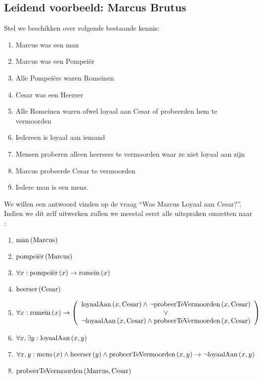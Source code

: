 \subsection{Leidend voorbeeld: Marcus Brutus}
\begin{leftbar}
Stel we beschikken over volgende bestaande kennis:
\begin{enumerate}
 \item Marcus was een man
 \item Marcus was een Pompeiër
 \item Alle Pompeiërs waren Romeinen
 \item Cesar was een Heerser
 \item Alle Romeinen waren ofwel loyaal aan Cesar of probeerden hem te vermoorden
 \item Iedereen is loyaal aan iemand
 \item Mensen proberen alleen heersers te vermoorden waar ze niet loyaal aan zijn
 \item Marcus probeerde Cesar te vermoorden
 \item Iedere man is een mens.
\end{enumerate}
We willen een antwoord vinden op de vraag ``Was Marcus  Loyaal aan Cesar?''. Indien we dit zelf uitwerken zullen we meestal eerst alle uitspraken omzetten naar :
\begin{enumerate}
 \item $\mbox{man}\left( \mbox{Marcus} \right)$
 \item $\mbox{pompeiër}\left( \mbox{Marcus} \right)$
 \item $\forall x:\mbox{pompeiër}\left( x \right)\rightarrow\mbox{romein}\left( x \right)$
 \item $\mbox{heerser}\left( \mbox{Cesar} \right)$
\item $\forall x:\mbox{romein}\left( x \right)\rightarrow\left(\begin{array}{c}\mbox{loyaalAan}\left( x,\mbox{Cesar} \right)\wedge\neg\mbox{probeerTeVermoorden}\left( x,\mbox{Cesar} \right)\\\vee\\\neg\mbox{loyaalAan}\left( x,\mbox{Cesar} \right)\wedge\mbox{probeerTeVermoorden}\left( x,\mbox{Cesar} \right)\end{array}\right)$
 \item $\forall x, \exists y:\mbox{loyaalAan}\left( x,y \right)$
 \item $\forall x,y:\mbox{mens}\left( x \right)\wedge\mbox{heerser}\left( y \right)\wedge\mbox{probeerTeVermoorden}\left( x,y \right)\rightarrow\neg\mbox{loyaalAan}\left( x,y \right)$
 \item $\mbox{probeerTeVermoorden}\left( \mbox{Marcus},\mbox{Cesar} \right)$

\end{enumerate}
\end{leftbar}
